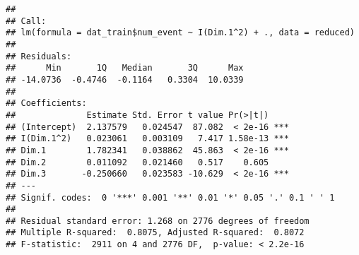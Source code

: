 \documentclass[
  a3paper,
]{article}
\newenvironment{Shaded}{\begin{snugshade}}{\end{snugshade}}
\newcommand{\AttributeTok}[1]{\textcolor[rgb]{0.13,0.29,0.53}{#1}}
\newcommand{\CommentTok}[1]{\textcolor[rgb]{0.56,0.35,0.01}{\textit{#1}}}
\newcommand{\ConstantTok}[1]{\textcolor[rgb]{0.56,0.35,0.01}{#1}}
\newcommand{\DecValTok}[1]{\textcolor[rgb]{0.00,0.00,0.81}{#1}}
\newcommand{\FloatTok}[1]{\textcolor[rgb]{0.00,0.00,0.81}{#1}}
\newcommand{\FunctionTok}[1]{\textcolor[rgb]{0.13,0.29,0.53}{\textbf{#1}}}
\newcommand{\NormalTok}[1]{#1}
\newcommand{\OtherTok}[1]{\textcolor[rgb]{0.56,0.35,0.01}{#1}}
\newcommand{\SpecialCharTok}[1]{\textcolor[rgb]{0.81,0.36,0.00}{\textbf{#1}}}
\begin{document}
\begin{Shaded}
\end{Shaded}

\begin{verbatim}
## 
## Call:
## lm(formula = dat_train$num_event ~ I(Dim.1^2) + ., data = reduced)
## 
## Residuals:
##      Min       1Q   Median       3Q      Max 
## -14.0736  -0.4746  -0.1164   0.3304  10.0339 
## 
## Coefficients:
##              Estimate Std. Error t value Pr(>|t|)    
## (Intercept)  2.137579   0.024547  87.082  < 2e-16 ***
## I(Dim.1^2)   0.023061   0.003109   7.417 1.58e-13 ***
## Dim.1        1.782341   0.038862  45.863  < 2e-16 ***
## Dim.2        0.011092   0.021460   0.517    0.605    
## Dim.3       -0.250660   0.023583 -10.629  < 2e-16 ***
## ---
## Signif. codes:  0 '***' 0.001 '**' 0.01 '*' 0.05 '.' 0.1 ' ' 1
## 
## Residual standard error: 1.268 on 2776 degrees of freedom
## Multiple R-squared:  0.8075, Adjusted R-squared:  0.8072 
## F-statistic:  2911 on 4 and 2776 DF,  p-value: < 2.2e-16
\end{verbatim}
\end{document}
